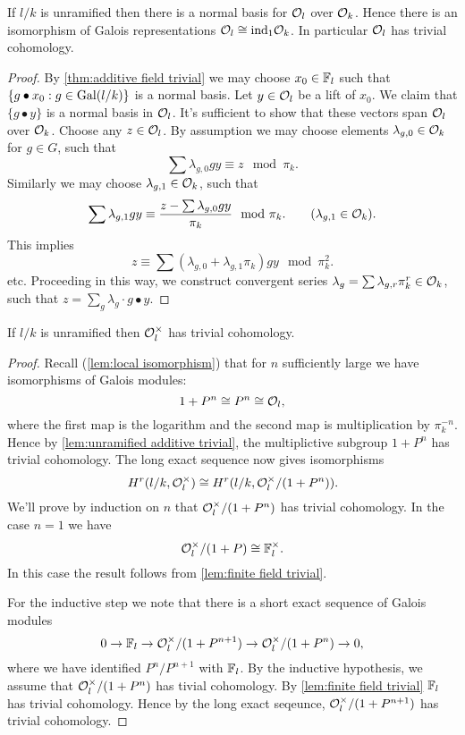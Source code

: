 \begin{lemma} \label{lem:unramified additive trivial}
	If $l/k$ is unramified then there is a normal basis for ${\mathcal O}_l$ over ${\mathcal O}_k$.
	Hence there is an isomorphism of Galois representations ${\mathcal O}_l \cong \mathrm{ind}_1 {\mathcal O}_k$.
	In particular ${\mathcal O}_l$ has trivial cohomology.
\end{lemma}

\begin{proof}
	By \ref{thm:additive field trivial}
	we may choose $x_0 \in {\mathbb F}_l$
	such that $\{g \bullet x_0 :g \in \mathrm{Gal}(l/k)\}$ is a normal basis.
	Let $y \in {\mathcal O}_l$ be a lift of $x_0$.
	We claim that $\{g \bullet y\}$ is a normal basis	in ${\mathcal O}_l$.
	It's sufficient to show that these vectors span ${\mathcal O}_l$ over ${\mathcal O}_k$.
	Choose any $z \in {\mathcal O}_l$. By assumption we may choose elements
	$\lambda_{g,0} \in {\mathcal O}_k$ for $g \in G$, such that
	\[
		\sum \lambda_{g,0} g y \equiv z \mod \pi_k.
	\]
	Similarly we may choose $\lambda_{g,1} \in {\mathcal O}_k$, such that
	\[
		\sum \lambda_{g,1} g y \equiv \frac{z - \sum \lambda_{g,0} g y}{\pi_k} \mod \pi_k.
		\qquad
		(\lambda_{g,1} \in {\mathcal O}_k).
	\]
	This implies
	\[
		z \equiv \sum (\lambda_{g,0} + \lambda_{g,1} \pi_k) g y \mod \pi_k^2.
	\]
	etc.
	Proceeding in this way, we construct convergent series
	$\lambda_{g} = \sum \lambda_{g,r}\pi_k^r \in {\mathcal O}_k$,
	such that $z = \sum_g \lambda_g \cdot g \bullet y$.
\end{proof}




\begin{lemma}	\label{lem:unramified units trivial}
	If $l/k$ is unramified then ${\mathcal O}_l^\times$ has trivial cohomology.
\end{lemma}

\begin{proof}
	Recall (\ref{lem:local isomorphism}) that for $n$ sufficiently large we have isomorphisms of
	Galois modules:
	\[
		1 + P^n \cong P^n \cong {\mathcal O}_l,
	\]
	where the first map is the logarithm and the second map is multiplication by $\pi_k^{-n}$.
	Hence by \ref{lem:unramified additive trivial}, the multiplictive subgroup $1+P^n$ has trivial
	cohomology.
	The long exact sequence now gives isomorphisms
	\[
		H^r(l/k,{\mathcal O}_l^\times) \cong H^r(l/k,{\mathcal O}_l^\times / (1+P^n)).
	\]
	We'll prove by induction on $n$ that ${\mathcal O}_l^\times / (1+P^n)$ has trivial cohomology.
	In the case $n = 1$ we have
	\[
		{\mathcal O}_l^\times / (1+P) \cong {\mathbb F}_l^\times.
	\]
	In this case the result follows from \ref{lem:finite field trivial}.

	For the inductive step we note that there is a short exact sequence of Galois modules
	\[
		0 \to {\mathbb F}_l \to  {\mathcal O}_l^\times / (1+P^{n+1})  \to{\mathcal O}_l^\times / (1+P^n)  \to  0,
	\]
	where we have identified $P^n / P^{n+1}$ with ${\mathbb F}_l$.
	By the inductive hypothesis, we assume that ${\mathcal O}_l^\times / (1+P^n)$ has tivial cohomology.
	By \ref{lem:finite field trivial} ${\mathbb F}_l$ has trivial cohomology.
	Hence by the long exact seqeunce, ${\mathcal O}_l^\times / (1+P^{n+1})$ has trivial cohomology.
\end{proof}


